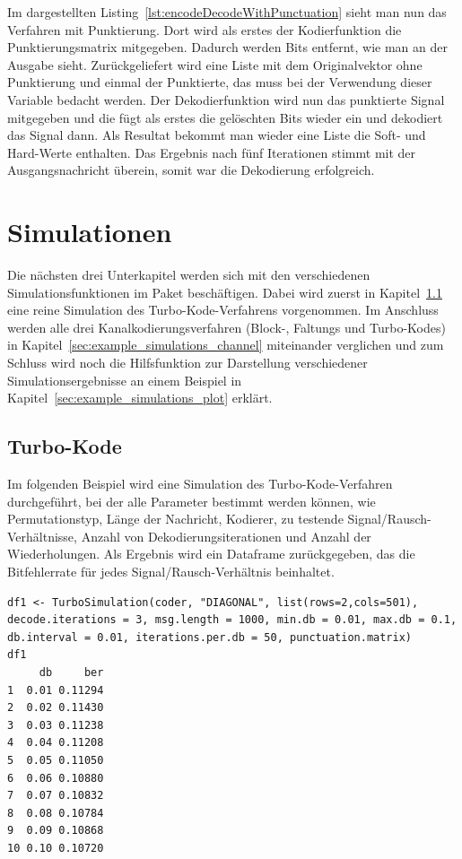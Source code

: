 Im dargestellten Listing~\ref{lst:encodeDecodeWithPunctuation} sieht man nun das Verfahren mit Punktierung. Dort wird als erstes der Kodierfunktion die Punktierungsmatrix mitgegeben. Dadurch werden Bits entfernt, wie man an der Ausgabe sieht. Zurückgeliefert wird eine Liste mit dem Originalvektor ohne Punktierung und einmal der Punktierte, das muss bei der Verwendung dieser Variable bedacht werden. Der Dekodierfunktion wird nun das punktierte Signal mitgegeben und die fügt als erstes die gelöschten Bits wieder ein und dekodiert das Signal dann. Als Resultat bekommt man wieder eine Liste die Soft- und Hard-Werte enthalten. Das Ergebnis nach fünf Iterationen stimmt mit der Ausgangsnachricht überein, somit war die Dekodierung erfolgreich.

\FloatBarrier
\section{Simulationen}
\label{sec:example_simulations}

Die nächsten drei Unterkapitel werden sich mit den verschiedenen Simulationsfunktionen im Paket beschäftigen. Dabei wird zuerst in Kapitel~\ref{sec:example_simulations_turbo} eine reine Simulation des Turbo-Kode-Verfahrens vorgenommen. Im Anschluss werden alle drei Kanalkodierungsverfahren (Block-, Faltungs und Turbo-Kodes) in Kapitel~\ref{sec:example_simulations_channel} miteinander verglichen und zum Schluss wird noch die Hilfsfunktion zur Darstellung verschiedener Simulationsergebnisse an einem Beispiel in Kapitel~\ref{sec:example_simulations_plot} erklärt.

\subsection{Turbo-Kode}
\label{sec:example_simulations_turbo}

Im folgenden Beispiel wird eine Simulation des Turbo-Kode-Verfahren durchgeführt, bei der alle Parameter bestimmt werden können, wie Permutationstyp, Länge der Nachricht, Kodierer, zu testende Signal/Rausch-Verhältnisse, Anzahl von Dekodierungsiterationen und Anzahl der Wiederholungen. Als Ergebnis wird ein Dataframe zurückgegeben, das die Bitfehlerrate für jedes Signal/Rausch-Verhältnis beinhaltet.

\begin{lstlisting}[caption=Turbo-Kode-Simulation, label={lst:turboCodeSimulation}, float=!th]
df1 <- TurboSimulation(coder, "DIAGONAL", list(rows=2,cols=501), decode.iterations = 3, msg.length = 1000, min.db = 0.01, max.db = 0.1, db.interval = 0.01, iterations.per.db = 50, punctuation.matrix)
df1
     db     ber
1  0.01 0.11294
2  0.02 0.11430
3  0.03 0.11238
4  0.04 0.11208
5  0.05 0.11050
6  0.06 0.10880
7  0.07 0.10832
8  0.08 0.10784
9  0.09 0.10868
10 0.10 0.10720
\end{lstlisting}

